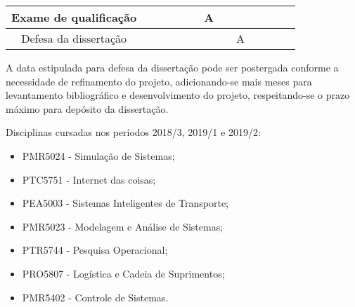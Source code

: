 \begin{table}[htb]
{\begin{tabular}{|c|c|c|c|c|c|c|c|c|c|c|c|c|}
				\hline
				Exame de qualificação
				&
				& 
				&
				&
				&
				& \cellcolor[HTML]{FFCB2F}A
				&
				& \\
				
				\hline
				Defesa da dissertação
				&
				&
				&
				&
				&
				&
				&
				& \cellcolor[HTML]{FFCB2F}A \\
				\hline
				
		\end{tabular}}
	\end{table}

	A data estipulada para defesa da dissertação pode ser postergada conforme a necessidade de refinamento do projeto, adicionando-se mais meses para levantamento bibliográfico e desenvolvimento do projeto, respeitando-se o prazo máximo para depósito da dissertação. 
	
	Disciplinas cursadas nos períodos 2018/3, 2019/1 e 2019/2:
	\begin{itemize}
		\item PMR5024 - Simulação de Sistemas;
		\item PTC5751 - Internet das coisas;
		\item PEA5003 - Sistemas Inteligentes de Transporte;
		\item PMR5023 - Modelagem e Análise de Sistemas;
		\item PTR5744 - Pesquisa Operacional;
		\item PRO5807 - Logística e Cadeia de Suprimentos;
		\item PMR5402 - Controle de Sistemas.
	\end{itemize}

	
